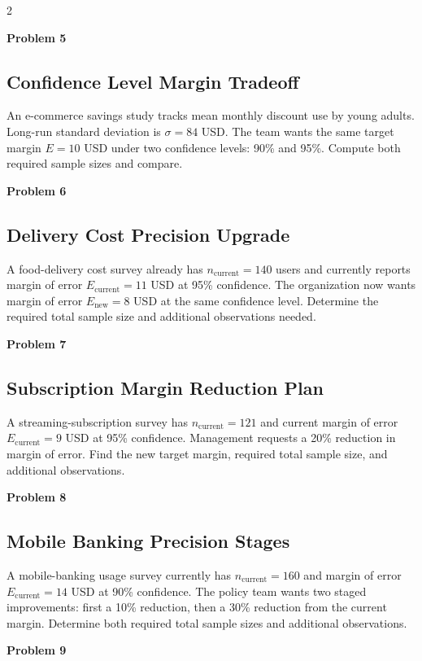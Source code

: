 \documentclass[12pt]{article}
\newcommand{\SubsectionBox}[1]{%
\noindent\colorbox{gray!30}{\parbox{\linewidth}{\textbf{#1}}}\par\vspace{0.35cm}%
}
\begin{document}
\begin{multicols}{2}
\vspace{0.5cm}
\SubsectionBox{Problem 5}
\subsection*{Confidence Level Margin Tradeoff}
An e-commerce savings study tracks mean monthly discount use by young adults. Long-run standard deviation is $\sigma = 84$ USD. The team wants the same target margin $E = 10$ USD under two confidence levels: 90\% and 95\%. Compute both required sample sizes and compare.

\vspace{0.5cm}
\SubsectionBox{Problem 6}
\subsection*{Delivery Cost Precision Upgrade}
A food-delivery cost survey already has $n_{\text{current}} = 140$ users and currently reports margin of error $E_{\text{current}} = 11$ USD at 95\% confidence. The organization now wants margin of error $E_{\text{new}} = 8$ USD at the same confidence level. Determine the required total sample size and additional observations needed.

\vspace{0.5cm}
\SubsectionBox{Problem 7}
\subsection*{Subscription Margin Reduction Plan}
A streaming-subscription survey has $n_{\text{current}} = 121$ and current margin of error $E_{\text{current}} = 9$ USD at 95\% confidence. Management requests a 20\% reduction in margin of error. Find the new target margin, required total sample size, and additional observations.

\vspace{0.5cm}
\SubsectionBox{Problem 8}
\subsection*{Mobile Banking Precision Stages}
A mobile-banking usage survey currently has $n_{\text{current}} = 160$ and margin of error $E_{\text{current}} = 14$ USD at 90\% confidence. The policy team wants two staged improvements: first a 10\% reduction, then a 30\% reduction from the current margin. Determine both required total sample sizes and additional observations.

\vspace{0.5cm}
\SubsectionBox{Problem 9}

\end{multicols}
\end{document}
